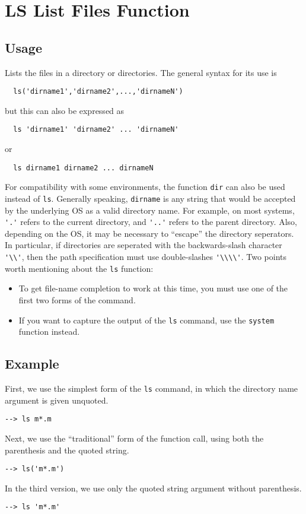 \section{LS List Files Function}

\subsection{Usage}

Lists the files in a directory or directories.  The general syntax for its use is
\begin{verbatim}
  ls('dirname1','dirname2',...,'dirnameN')
\end{verbatim}
but this can also be expressed as
\begin{verbatim}
  ls 'dirname1' 'dirname2' ... 'dirnameN'
\end{verbatim}
or 
\begin{verbatim}
  ls dirname1 dirname2 ... dirnameN
\end{verbatim}
For compatibility with some environments, the function \verb|dir| can also be used instead of \verb|ls|.  Generally speaking, \verb|dirname| is any string that would be accepted by the underlying OS as a valid directory name.  For example, on most systems, \verb|'.'| refers to the current directory, and \verb|'..'| refers to the parent directory.  Also, depending on the OS, it may be necessary to ``escape'' the directory seperators.  In particular, if directories are seperated with the backwards-slash character \verb|'\\'|, then the path specification must use double-slashes \verb|'\\\\'|. Two points worth mentioning about the \verb|ls| function:
\begin{itemize}
\item  To get file-name completion to work at this time, you must use one of the first two forms of the command.

\item  If you want to capture the output of the \verb|ls| command, use the \verb|system| function instead.

\end{itemize}

\subsection{Example}

First, we use the simplest form of the \verb|ls| command, in which the directory name argument is given unquoted.
\begin{verbatim}
--> ls m*.m
\end{verbatim}
Next, we use the ``traditional'' form of the function call, using both the parenthesis and the quoted string.
\begin{verbatim}
--> ls('m*.m')
\end{verbatim}
In the third version, we use only the quoted string argument without parenthesis.  
\begin{verbatim}
--> ls 'm*.m'
\end{verbatim}
